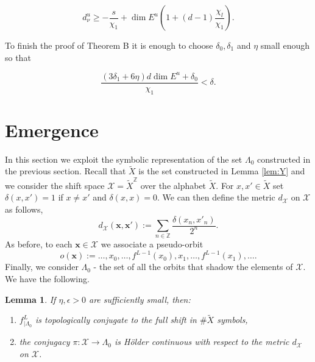\documentclass{amsart}
\theoremstyle{plain}
\newtheorem{lem}[thm]{Lemma}
\theoremstyle{definition}
\theoremstyle{remark}
\numberwithin{equation}{section}
\begin{document}
$$   d^u_{\nu} \geq    -\frac{s}{\chi_1} + \dim E^u \left(   1+  (d-1) \frac{\chi_l}{\chi_1}   \right).$$

To finish the proof of Theorem B it is enough to choose $\delta_0, \delta_1$ and $\eta$ small enough so that

$$   \frac{  (3 \delta_1 + 6\eta)d \dim E^u + \delta_0     }{\chi_1}   < \delta.  $$




\section{Emergence}\label{sec:emer}

In this section we exploit the symbolic representation of the set $\Lambda_0$ constructed in the previous section. 
Recall that $\tilde{X}$ is the set constructed in Lemma \ref{lem:Y} and we consider the shift space $\mathcal{X}=\tilde{X}^{\mathbb{Z}}$ over the alphabet $\tilde{X}$. 
For $x,x'\in \tilde{X}$ set $\delta(x,x')=1$ if $x\neq x'$ and $\delta(x,x)=0$. We can then define the metric $d_{\mathcal{X}}$ on $\mathcal{X}$ as follows,
$$d_{\mathcal{X}}(\textbf{x},\textbf{x}'):= \sum_{n\in \mathbb{Z}}  \frac{\delta(x_n,x'_n)}{2^n}.$$
As before, to each  $\textbf{x}\in \mathcal{X}$ we associate a pseudo-orbit
$$   o(\textbf{x})  := \ldots  ,   x_0, \ldots, f^{L-1}(x_0), x_1 , \ldots , f^{L-1}(x_1), \ldots.   $$
Finally, we consider $\Lambda_0$ - the set of all the orbits that shadow the elements of $\mathcal{X}$.
We have the following.
\begin{lem}\label{lem:hor}
If $\eta, \epsilon>0$ are sufficiently small, then:
\begin{enumerate}
\item$f^L_{|\Lambda_0}$ is topologically conjugate to the full shift in $\# \tilde{X}$ symbols,
\item the conjugacy $\pi : \mathcal{X} \to \Lambda_0$ is H\"older continuous with respect to the metric $d_{\mathcal{X}}$ on $\mathcal{X}$.
\end{enumerate}
\end{lem} 
\end{document}
